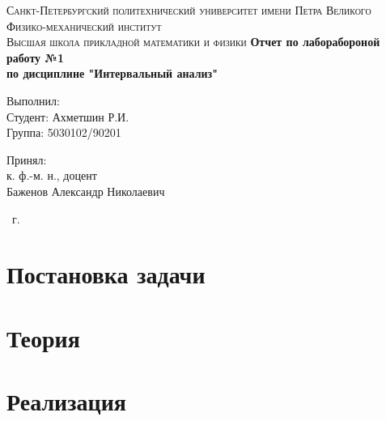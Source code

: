 \documentclass[14pt,a4paper,article]{ncc}
\begin{document}
\begin{titlepage}
    \begin{center}
        \textsc{
            Санкт-Петербургский политехнический университет имени Петра Великого \\[5mm]
            Физико-механический институт\\[2mm]
            Высшая школа прикладной математики и физики            
        }   
        \vfill
        \textbf{\large
            Отчет по лаборабороной работу №1\\
            по дисциплине "Интервальный анализ"\\[3mm]
        }                
    \end{center}

    \vfill
    \hfill
    \begin{minipage}{0.5\textwidth}
        Выполнил: \\[2mm]   
		Студент: Ахметшин Р.И. \\
		Группа: 5030102/90201\\
    \end{minipage}

	\hfill
	\begin{minipage}{0.5\textwidth}
		Принял: \\[2mm]
		к. ф.-м. н., доцент \\   
		Баженов Александр Николаевич
	\end{minipage}

    \vfill
    \begin{center}
        \theyear\ г.
    \end{center}
\end{titlepage}

\tableofcontents
\newpage
\listoffigures
\newpage
\listoftables
\newpage

\section{Постановка задачи}


\newpage

\section{Теория}

\newpage

\section{Реализация}

\newpage
\end{document}
